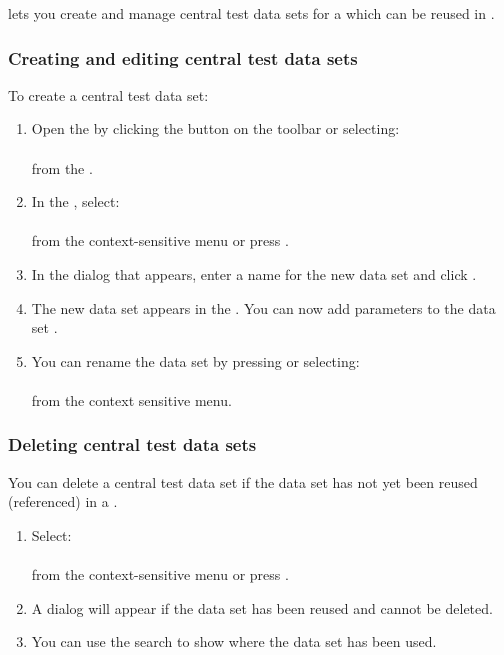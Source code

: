 \jb{} lets you create and manage central test data sets for a \gdproject{} which can be reused in \gdcases{}. 

\subsubsection{Creating and editing central test data sets}
\label{TasksCentralDataCreate}

To create a central test data set:
\begin{enumerate}
\item Open the  \gddataeditor{} by clicking the  button on the toolbar or selecting:\\
\\
from the \gdtestsuitebrowser{}.
\item In the \gddataeditor{}, select:\\
\\
from the context-sensitive menu or press .
\item In the dialog that appears, enter a name for the new data set and click .
\item The new data set appears in the \gddataeditor{}. You can now add parameters to the data set .
\item You can rename the data set by pressing or selecting:\\
\\
from the context sensitive menu.
\end{enumerate}

\subsubsection{Deleting central test data sets}
You can delete a central test data set if the data set has not yet been reused (referenced) in a \gdcase{} . 
\begin{enumerate}
\item Select:\\
\\
from the context-sensitive menu or press .

\item A dialog will appear if the data set has been reused and cannot be deleted.
\item You can use the search  to show where the data set has been used.
\end{enumerate}

